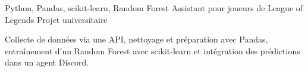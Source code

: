 
\begin{cventries}
  \cventry
    {Python, Pandas, scikit-learn, Random Forest}
    {Assistant pour joueurs de League of Legends}
    {Projet universitaire}
    {}
    {
      \begin{cvitems}
        \item {Collecte de données via une API, nettoyage et préparation avec Pandas, entraînement d’un Random Forest avec scikit-learn et intégration des prédictions dans un agent Discord.}
      \end{cvitems}
    }
\end{cventries}
